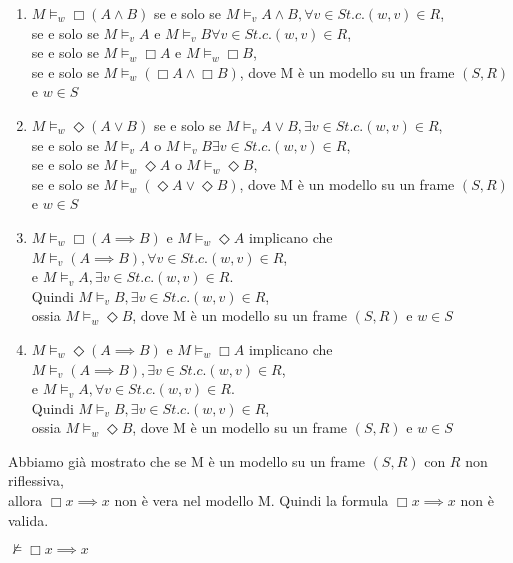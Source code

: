 \documentclass[a4paper,12pt]{article}
\theoremstyle{def}
\theoremstyle{prop}
\theoremstyle{esempio}
\theoremstyle{dimostrazione}
\theoremstyle{teo}
\theoremstyle{osservazione}
\begin{document}
\begin{enumerate}
	\item \(M \vDash_w \Box (A \land B)\) se e solo se \(M \vDash_v A \land B, \forall v \in S t.c. (w,v) \in R\),\\
				se e solo se \(M \vDash_v A \text{ e } M \vDash_v B \forall v \in S t.c. (w,v) \in R\),\\
				se e solo se \(M \vDash_w \Box A\) e \(M \vDash_w \Box B\),\\
				se e solo se \(M \vDash_w (\Box A \land \Box B)\), dove M è un modello su un frame \((S,R)\) e \(w \in S\)
	\item \(M \vDash_w \Diamond (A \lor B)\) se e solo se \(M \vDash_v A \lor B, \exists v \in S t.c. (w,v) \in R\),\\
				se e solo se \(M \vDash_v A \text{ o } M \vDash_v B \exists v \in S t.c. (w,v) \in R\),\\
				se e solo se \(M \vDash_w \Diamond A \text{ o } M \vDash_w \Diamond B\),\\
				se e solo se \(M \vDash_w (\Diamond A \lor \Diamond B)\), dove M è un modello su un frame \((S,R)\) e \(w \in S\)
	\item \(M \vDash_w \Box (A \implies B)\) e \(M \vDash_w \Diamond A\) implicano che \(M \vDash_v (A \implies B), \forall v \in S t.c. (w,v) \in R\),\\
				e \(M \vDash_v A, \exists v \in S t.c. (w,v) \in R\).\\
				Quindi \(M \vDash_v B, \exists  v \in S t.c. (w,v) \in R\),\\
				ossia \(M \vDash_w \Diamond B\), dove M è un modello su un frame \((S,R)\) e \(w \in S\)
	\item \(M \vDash_w \Diamond (A \implies B)\) e \(M \vDash_w \Box A\) implicano che \(M \vDash_v (A \implies B), \exists v \in S t.c. (w,v) \in R\),\\
				e \(M \vDash_v A, \forall v \in S t.c. (w,v) \in R\).\\
				Quindi \(M \vDash_v B, \exists v \in S t.c. (w,v) \in R\),\\
				ossia \(M \vDash_w \Diamond B\), dove M è un modello su un frame \((S,R)\) e \(w \in S\)\\
\end{enumerate}
Abbiamo già mostrato che se M è un modello su un frame \((S,R)\) con \(R\) non riflessiva,\\
allora \(\Box x \implies x\) non è vera nel modello M. Quindi la formula \(\Box x \implies x\) non è valida.
\begin{center}
	\(\nvDash \Box x \implies x\)
\end{center}
\end{document}
